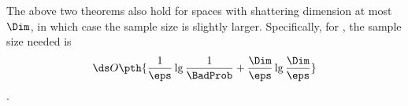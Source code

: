 \begin{remark}
        The above two theorems also hold for spaces with shattering
        dimension at most $\Dim$, in which case the sample size is
        slightly larger.  Specifically, for , the
        sample size needed is
        \begin{equation*}
            \ds O\pth{ \frac{1}{\eps} \lg
               \frac{1}{\BadProb} + \frac{\Dim}{\eps}\lg \frac{\Dim}{\eps}
            }
        \end{equation*}.        
    \end{remark}
